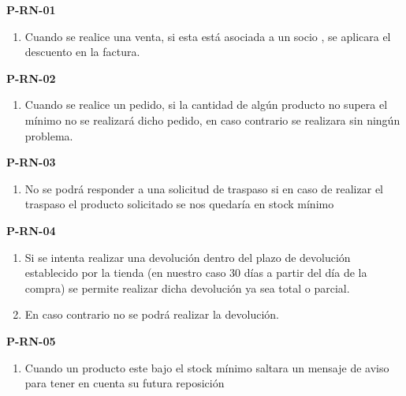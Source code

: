 \textbf{P-RN-01}
\begin{enumerate}
	\item Cuando se realice una venta, si esta está asociada a un socio , se aplicara el descuento en la factura.
\end{enumerate}

\textbf{P-RN-02}
\begin{enumerate}
	\item Cuando se realice un pedido, si la cantidad de algún producto no supera el mínimo no se realizará dicho pedido, en caso contrario se realizara sin ningún problema.
\end{enumerate}

\textbf{P-RN-03}
\begin{enumerate}
	\item No se podrá responder a una solicitud de traspaso si en caso de realizar el traspaso el producto solicitado se nos quedaría en stock mínimo
\end{enumerate}

\textbf{P-RN-04}
\begin{enumerate}
	\item Si se intenta realizar una devolución dentro del plazo de devolución establecido por la tienda (en nuestro caso 30 días a partir del día de la compra) se permite realizar dicha devolución ya sea total o parcial.
	\item En caso contrario no se podrá realizar la devolución.
\end{enumerate}

\textbf{P-RN-05}
\begin{enumerate}
	\item Cuando un producto este bajo el stock mínimo saltara un mensaje de aviso para tener en cuenta su futura reposición 
\end{enumerate}

